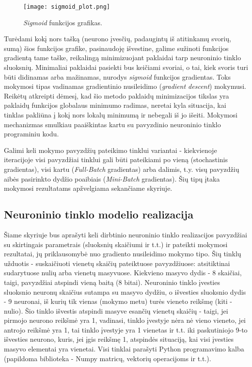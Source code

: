 \documentclass[a4paper,12pt]{article}
\begin{document}
\begin{figure}[h]
	\centering
		\texttt{[image: sigmoid\_plot.png]}
	\caption{\textit{Sigmoid} funkcijos grafikas.}
\end{figure}

Turėdami kokį nors tašką (neurono įvesčių, padaugintų iš atitinkamų svorių, sumą) šios funkcijos grafike, pasinaudoję išvestine, galime sužinoti funkcijos gradientą tame taške, reikalingą minimizuojant paklaidai tarp neuroninio tinklo sluoksnių. Minimaliai paklaidai pasiekti bus keičiami svoriai, o tai, kiek svoris turi būti didinamas arba mažinamas, nurodys \textit{sigmoid} funkcijos gradientas. Toks mokymosi tipas vadinamas gradientinio nusileidimo (\textit{gradient descent}) mokymusi. Reikėtų atkreipti dėmesį, kad šio metodo paklaidų minimizacijos tikslas yra paklaidų funkcijos globalaus minimumo radimas, neretai kyla situacija, kai tinklas pakliūna į kokį nors lokalų minimumą ir nebegali iš jo išeiti. Mokymosi mechanizmas smulkiau paaiškintas kartu su pavyzdinio neuroninio tinklo programiniu kodu.
	
Galimi keli mokymo pavyzdžių pateikimo tinklui variantai - kiekvienoje iteracijoje visi pavyzdžiai tinklui gali būti pateikiami po vieną (stochastinis gradientas), visi kartu (\textit{Full-Batch} gradientas) arba dalimis, t.y. visų pavyzdžių aibės pasirinkto dydžio poaibiais (\textit{Mini-Batch} gradientas)\cite{sebastianruder}. Šių tipų įtaka mokymosi rezultatams apžvelgiama sekančiame skyriuje.

\subsection{Neuroninio tinklo modelio realizacija}
\indent\indent
Šiame skyriuje bus aprašyti keli dirbtinio neuroninio tinklo realizacijos pavyzdžiai su skirtingais parametrais (sluoksnių skaičiumi ir t.t.) ir pateikti mokymosi rezultatai, jų priklausomybė nuo gradiento nusileidimo mokymo tipo. Šių tinklų užduotis - suskaičiuoti vienetų skaičių pateiktuose pavyzdžiuose: atsitiktinai sudarytuose nulių arba vienetų masyvuose. Kiekvieno masyvo dydis - 8 skaičiai, taigi, pavyzdžiai atspindi vieną baitą (8 bitai). Neuroninio tinklo įvesties sluoksnio neuronų skaičius sutampa su masyvo dydžiu, o išvesties sluoksnio dydis - 9 neuronai, iš kurių tik vienas (mokymo metu) turės vieneto reikšmę (kiti - nulio). Šio tinklo išvestis atspindi masyve esančių vienetų skaičių - taigi, jei pirmojo neurono reikšmė yra 1, vadinasi, tinklo įvestyje nėra nė vieno vieneto, jei antrojo reikšmė yra 1, tai tinklo įvestyje yra 1 vienetas ir t.t. iki paskutiniojo 9-to išvesties neurono, kuris, jei įgis reikšmę 1, atspindės situaciją, kai visi įvesties masyvo elementai yra vienetai. Visi tinklai parašyti Python programavimo kalba (papildoma biblioteka - Numpy matricų, vektorių operacijoms ir t.t.).
\end{document}
